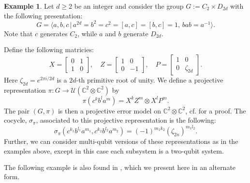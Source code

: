 \documentclass[11pt]{article}
\theoremstyle{definition}
\newtheorem{example}{Example}
\newcommand{\bbC}{\mathbb{C}}
\newcommand{\calU}{\mathcal{U}}
\begin{document}
\begin{example}\label{cdexample}
    Let $d \geq 2$ be an integer and consider the group $G := C_2 \times D_{2d}$ with the following presentation:
    \begin{equation*}
        G = \langle a, b, c \, \vert \, a^{2d} = b^2 = c^2 = [a,c] = [b,c] = 1, \, bab = a^{-1} \rangle.
    \end{equation*}
    Note that $c$ generates $C_2$, while $a$ and $b$ generate $D_{2d}$.
    
    Define the following matricies:
    \begin{equation*}
        X =
        \begin{bmatrix}
            0 & 1 \\
            1 & 0
        \end{bmatrix}, \quad
        Z =
        \begin{bmatrix}
            1 & 0 \\
            0 & -1
        \end{bmatrix}, \quad
        P =
        \begin{bmatrix}
            1 & 0 \\
            0 & \zeta_{2d}
        \end{bmatrix}.
    \end{equation*}
    Here $\zeta_{2d} = e^{2\pi i/2d}$ is a $2d$-th primitive root of unity. We define a projective representation $\pi \colon G \to \calU(\bbC^2 \otimes \bbC^2)$ by
    \begin{equation}\label{cdexampleeqn}
        \pi(c^kb^la^m) = X^kZ^m \otimes X^lP^m.
    \end{equation}
    The pair $(G, \pi)$ is then a projective error model on $\bbC^2 \otimes \bbC^2$, cf. \cite[Proposition 8.1]{Eidesen2025} for a proof. The cocycle, $\sigma_\pi$, associated to this projective representation is the following:
    \begin{equation*}
        \sigma_\pi(c^{k_1}b^{l_1}a^{m_1}, c^{k_2}b^{l_2}a^{m_2}) = (-1)^{m_1k_2}(\zeta_{2n})^{m_1l_2}.
    \end{equation*}
Further, we can consider multi-qubit versions of these representations as in the examples above, except in this case each subsystem is a two-qubit system. 
\end{example}

The following example is also found in \cite[Proposition 8.2]{Eidesen2025}, which we present here in an alternate form.
\end{document}
